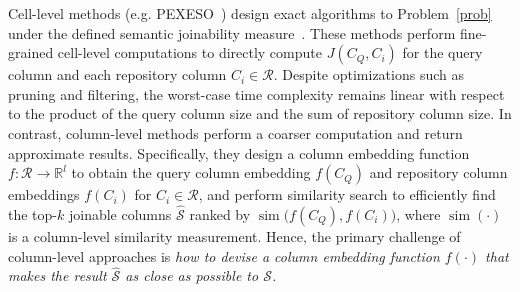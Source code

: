 Cell-level methods  (e.g. PEXESO~\cite{Pexeso}) design exact algorithms to Problem~\ref{prob} under the defined semantic joinability measure~\cite{Deepjoin}. These methods perform fine-grained cell-level computations to directly compute $J(C_Q, C_i)$ for the query column and each repository column $C_i \in \mathcal{R}$. Despite optimizations such as pruning and filtering, the worst-case time complexity remains linear with respect to the product of the query column size and the sum of repository column size.
In contrast, column-level methods perform a coarser computation and return approximate results. Specifically, they design a column embedding function $f: \mathcal{R} \rightarrow \mathbb{R}^l$ to obtain the query column embedding $f(C_Q)$ and repository column embeddings $f(C_i)$ for $C_i \in \mathcal{R}$, and perform similarity search to efficiently find the top-$k$ joinable columns $\hat{\mathcal{S}}$ ranked by $\operatorname{sim}\bigl(f(C_Q), f(C_i)\big)$, where $\operatorname{sim}(\cdot)$ is a  column-level similarity measurement. 
Hence, the primary challenge of column-level approaches is \textit{how to devise a column embedding function $f(\cdot)$ that makes the result $\hat{\mathcal{S}}$ as close as possible to $\mathcal{S}$.} 




\label{subsec: pivot_tech}

